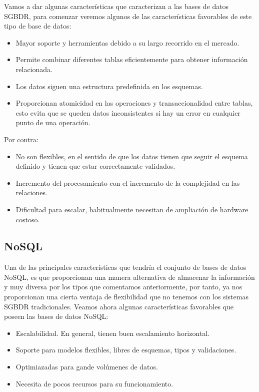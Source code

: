 Vamos a dar algunas características que caracterizan a las bases de datos SGBDR, para comenzar veremos algunos de las características favorables de este tipo de base de datos:

\begin{itemize}
    \item Mayor soporte y herramientas debido a su largo recorrido en el mercado.
    \item Permite combinar diferentes tablas eficientemente para obtener información relacionada.
    \item Los datos siguen una estructura predefinida en los esquemas.
    \item Proporcionan atomicidad en las operaciones y transaccionalidad entre tablas, esto evita que se queden datos inconsistentes si hay un error en cualquier punto de una operación.
\end{itemize}

Por contra:

\begin{itemize}
    \item No son flexibles, en el sentido de que los datos tienen que seguir el esquema definido y tienen que estar correctamente validados.
    \item Incremento del procesamiento con el incremento de la complejidad en las relaciones.
    \item Dificultad para escalar, habitualmente necesitan de ampliación de hardware costoso.
\end{itemize}

\subsection{NoSQL}

Una de las principales características que tendría el conjunto de bases de datos NoSQL, es que proporcionan una manera alternativa de almacenar la información y muy diversa por los tipos que comentamos anteriormente, por tanto, ya nos proporcionan una cierta ventaja de flexibilidad que no tenemos con los sistemas SGBDR tradicionales. Veamos ahora algunas características favorables que poseen las bases de datos NoSQL:

\begin{itemize}
    \item Escalabilidad. En general, tienen buen escalamiento horizontal.
    \item Soporte para modelos flexibles, libres de esquemas, tipos y validaciones.
    \item Optimiazadas para gande volúmenes de datos.
    \item Necesita de pocos recursos para su funcionamiento.
\end{itemize}

